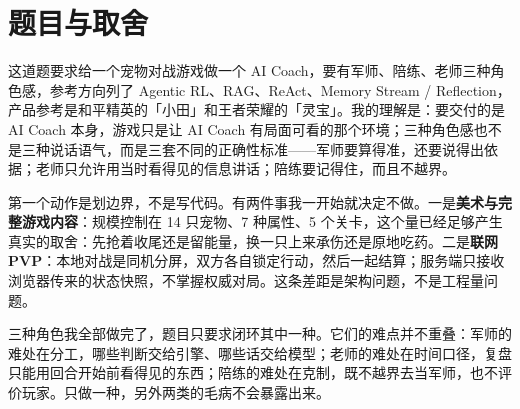 \section{题目与取舍}

这道题要求给一个宠物对战游戏做一个 AI Coach，要有军师、陪练、老师三种角色感，参考方向列了 Agentic RL、RAG、ReAct、Memory Stream / Reflection，产品参考是和平精英的「小田」和王者荣耀的「灵宝」。我的理解是：要交付的是 AI Coach 本身，游戏只是让 AI Coach 有局面可看的那个环境；三种角色感也不是三种说话语气，而是三套不同的正确性标准——军师要算得准，还要说得出依据；老师只允许用当时看得见的信息讲话；陪练要记得住，而且不越界。

第一个动作是划边界，不是写代码。有两件事我一开始就决定不做。一是\textbf{美术与完整游戏内容}：规模控制在 14 只宠物、7 种属性、5 个关卡，这个量已经足够产生真实的取舍：先抢着收尾还是留能量，换一只上来承伤还是原地吃药。二是\textbf{联网 PVP}：本地对战是同机分屏，双方各自锁定行动，然后一起结算；服务端只接收浏览器传来的状态快照，不掌握权威对局。这条差距是架构问题，不是工程量问题。

三种角色我全部做完了，题目只要求闭环其中一种。它们的难点并不重叠：军师的难处在分工，哪些判断交给引擎、哪些话交给模型；老师的难处在时间口径，复盘只能用回合开始前看得见的东西；陪练的难处在克制，既不越界去当军师，也不评价玩家。只做一种，另外两类的毛病不会暴露出来。
